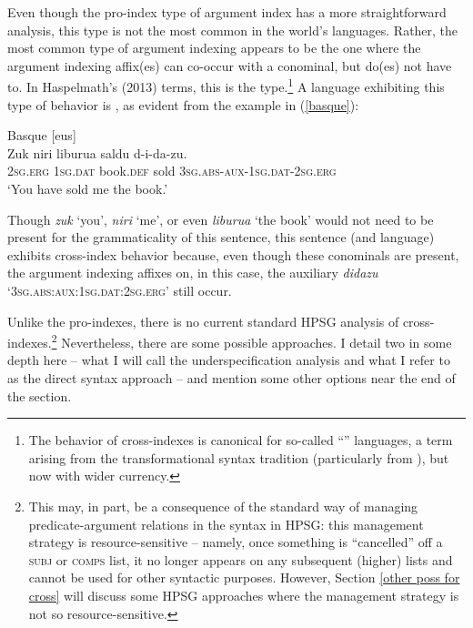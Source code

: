 \documentclass[output=paper
                ,modfonts
                ,nonflat
	        ,collection
	        ,collectionchapter
	        ,collectiontoclongg
 	        ,biblatex
                ,babelshorthands
                ,newtxmath
                ,draftmode
                ,colorlinks, citecolor=brown
]{./langsci/langscibook}
\begin{document}
{Even though the pro-index type of argument index has a more straightforward analysis, this type is not the most common in the world's languages. Rather, the most common type of argument indexing appears to be the one where the argument indexing affix(es) can co-occur with a conominal, but do(es) not have to.  In Haspelmath's (2013) terms, this is the  type.\footnote{The behavior of cross-indexes is canonical for so-called ``'' languages, a term arising from the transformational syntax tradition (particularly from \citealt{Chomsky81a}), but now with wider currency.} A language exhibiting this type of behavior is , as evident from the example in (\ref{basque}):    
%
\begin{samepage}
\begin{exe}
\ex\label{basque} Basque [eus] \citep[98]{laka96} \\
\gll Zuk niri liburua saldu d-i-da-zu. \\
\textsc{2sg.erg} \textsc{1sg.dat} book.\textsc{def} sold \textsc{3sg.abs}-\textsc{aux}-\textsc{1sg.dat}-\textsc{2sg.erg} \\
\glt `You have sold me the book.' 
\end{exe} 
\end{samepage}
%
Though \textit{zuk} `you', \textit{niri} `me', or even \textit{liburua}  `the book' would not need to be present for the grammaticality of this sentence, this sentence (and language) exhibits cross-index behavior because, even though these conominals are present, the argument indexing affixes on, in this case, the auxiliary \textit{didazu} `\textsc{3sg.abs}:\-\textsc{aux}:\-\textsc{1sg.dat}:\-\textsc{2sg.erg}' still occur. 

Unlike the pro-indexes, there is no current standard HPSG analysis of cross-indexes.\footnote{This may, in part, be a consequence of the standard way of managing predicate-argument relations in the syntax in HPSG: this management strategy is resource-sensitive -- namely, once something is ``cancelled'' off a \textsc{subj} or \textsc{comps} list, it no longer appears on any subsequent (higher) lists and cannot be used for other syntactic purposes. However, Section \ref{other poss for cross} will discuss some HPSG approaches where the management strategy is not so resource-sensitive.} Nevertheless, there are some possible approaches. I detail two in some depth here -- what I will call the underspecification analysis and what I refer to as the direct syntax approach -- and mention some other options near the end of the section.

}
\end{document}
